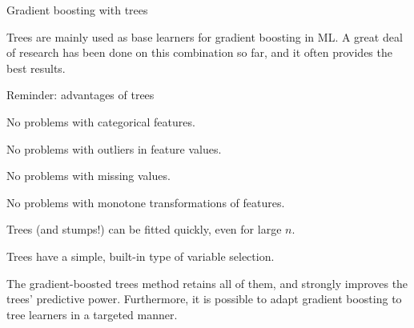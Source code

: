 \begin{vbframe}{Gradient boosting with trees}

Trees are mainly used as base learners for gradient boosting in ML.
A great deal of research has been done on this combination so far, and it often provides the best results.

\begin{blocki}{Reminder: advantages of trees}
\item No problems with categorical features.
\item No problems with outliers in feature values.
\item No problems with missing values.
\item No problems with monotone transformations of features.
\item Trees (and stumps!) can be fitted quickly, even for large $n$.
\item Trees have a simple, built-in type of variable selection.
\end{blocki}
The gradient-boosted trees method retains all of them, and strongly improves the trees' predictive power.
Furthermore, it is possible to adapt gradient boosting to tree learners in a targeted manner.

\end{vbframe}
